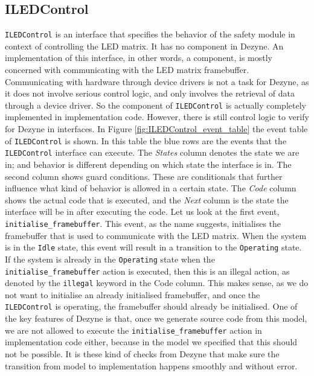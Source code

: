 \documentclass[12pt]{scrreprt}
\begin{document}
\begin{appendices}
\subsection{ILEDControl}
\texttt{ILEDControl} is an interface that specifies the behavior of the safety module in context of controlling the LED matrix. It has no component in Dezyne. An implementation of this interface, in other words, a component, is mostly concerned with communicating with the LED matrix framebuffer. Communicating with hardware through device drivers is not a task for Dezyne, as it does not involve serious control logic, and only involves the retrieval of data through a device driver. So the component of \texttt{ILEDControl} is actually completely implemented in implementation code. However, there is still control logic to verify for Dezyne in interfaces. In Figure \ref{fig:ILEDControl_event_table} the event table of \texttt{ILEDControl} is shown. In this table the blue rows are the events that the \texttt{ILEDControl} interface can execute. The \textit{States} column denotes the state we are in; and behavior is different depending on which state the interface is in. The second column shows guard conditions. These are conditionals that further influence what kind of behavior is allowed in a certain state. The \textit{Code} column shows the actual code that is executed, and the \textit{Next} column is the state the interface will be in after executing the code. Let us look at the first event, \texttt{initialise\_framebuffer}. This event, as the name suggests, initialises the framebuffer that is used to communicate with the LED matrix. When the system is in the \texttt{Idle} state, this event will result in a transition to the \texttt{Operating} state. If the system is already in the \texttt{Operating} state when the \texttt{initialise\_framebuffer} action is executed, then this is an illegal action, as denoted by the \texttt{illegal} keyword in the Code column. This makes sense, as we do not want to initialise an already initialised framebuffer, and once the \texttt{ILEDControl} is operating, the framebuffer should already be initialised. One of the key features of Dezyne is that, once we generate source code from this model, we are not allowed to execute the \texttt{initialise\_framebuffer} action in implementation code either, because in the model we specified that this should not be possible. It is these kind of checks from Dezyne that make sure the transition from model to implementation happens smoothly and without error. \par

\end{appendices}
\end{document}
